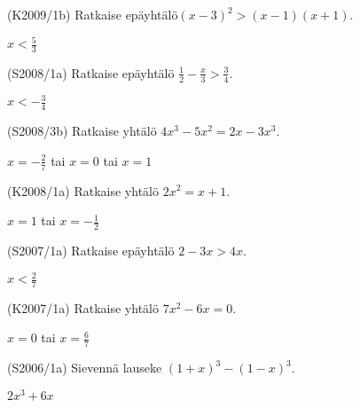 \begin{tehtava}
(K2009/1b) Ratkaise epäyhtälö$(x-3)^2>(x-1)(x+1)$.
\begin{vastaus}
$x<\frac{5}{3}$
\end{vastaus}
\end{tehtava}

\begin{tehtava}
(S2008/1a) Ratkaise epäyhtälö $\frac{1}{2} - \frac{x}{3} > \frac{3}{4}$.
\begin{vastaus}
$x<-\frac{3}{4}$
\end{vastaus}
\end{tehtava}


\begin{tehtava}
(S2008/3b) Ratkaise yhtälö $4x^3-5x^2=2x-3x^3$.
\begin{vastaus}
$x=-\frac{2}{7}$ tai $x=0$ tai $x=1$
\end{vastaus}
\end{tehtava}

\begin{tehtava}
(K2008/1a) Ratkaise yhtälö $2x^2=x+1$.
\begin{vastaus}
$x=1$ tai $x=-\frac{1}{2}$
\end{vastaus}
\end{tehtava}

\begin{tehtava}
(S2007/1a) Ratkaise epäyhtälö $2-3x>4x$.
\begin{vastaus}
$x< \frac{2}{7} $
\end{vastaus}
\end{tehtava}

\begin{tehtava}
(K2007/1a) Ratkaise yhtälö $7x^2-6x=0$.
\begin{vastaus}
$x=0$ tai $x=\frac{6}{7}$
\end{vastaus}
\end{tehtava}

\begin{tehtava}
(S2006/1a) Sievennä lauseke $(1+x)^3-(1-x)^3$.
\begin{vastaus}
$2x^3+6x$ 
\end{vastaus}
\end{tehtava}

